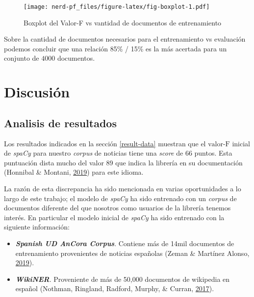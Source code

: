 \documentclass[12pt,a4paper,]{scrartcl}
\providecommand{\tightlist}{%
  \setlength{\itemsep}{0pt}\setlength{\parskip}{0pt}}
\begin{document}
\begin{figure}[H]

{\centering \texttt{[image: nerd-pf\_files/figure-latex/fig-boxplot-1.pdf]} 

}

\caption{Boxplot del Valor-F vs vantidad de documentos de entrenamiento}\label{fig:fig-boxplot}
\end{figure}

Sobre la cantidad de documentos necesarios para el entrenamiento vs evaluación podemos concluir que una relación 85\% / 15\% es la más acertada para un conjunto de \(4000\) documentos.

\newpage

\hypertarget{discussion}{%
\section{Discusión}\label{discussion}}

\hypertarget{analisis-de-resultados}{%
\subsection{Analisis de resultados}\label{analisis-de-resultados}}

Los resultados indicados en la sección \ref{result-data} muestran que el \(\text{valor-F}\) inicial de \emph{spaCy} para nuestro \emph{corpus} de noticias tiene una \emph{score} de 66 puntos. Esta puntuación dista mucho del valor 89 que indica la librería en su documentación (Honnibal \& Montani, \protect\hyperlink{ref-spacy-spanish-model}{2019}) para este idioma.

La razón de esta discrepancia ha sido mencionada en varias oportunidades a lo largo de este trabajo; el modelo de \emph{spaCy} ha sido entrenado con un \emph{corpus} de documentos diferente del que nosotros como usuarios de la librería tenemos interés. En particular el modelo inicial de \emph{spaCy} ha sido entrenado con la siguiente información:

\begin{itemize}
\tightlist
\item
  \textbf{\emph{Spanish UD AnCora Corpus}}. Contiene más de 14mil documentos de entrenamiento provenientes de noticias españolas (Zeman \& Martínez Alonso, \protect\hyperlink{ref-ancora-es}{2019}).
\item
  \textbf{\emph{WikiNER}}. Proveniente de más de 50,000 documentos de wikipedia en español (Nothman, Ringland, Radford, Murphy, \& Curran, \protect\hyperlink{ref-Nothman2017}{2017}).
\end{itemize}
\end{document}

